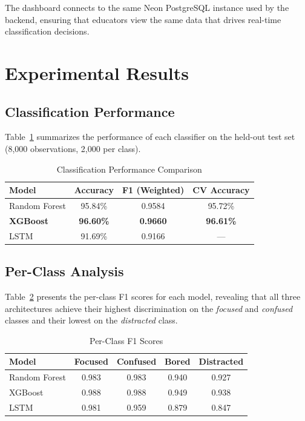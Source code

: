 \documentclass[conference]{IEEEtran}
\begin{document}
The dashboard connects to the same Neon PostgreSQL instance used by the backend, ensuring that educators view the same data that drives real-time classification decisions.

\section{Experimental Results}

\subsection{Classification Performance}

Table~\ref{tab:results} summarizes the performance of each classifier on the held-out test set (8,000 observations, 2,000 per class).

\begin{table}[h]
\caption{Classification Performance Comparison}
\label{tab:results}
\centering
\begin{tabular}{@{}lccc@{}}
\toprule
\textbf{Model} & \textbf{Accuracy} & \textbf{F1 (Weighted)} & \textbf{CV Accuracy} \\
\midrule
Random Forest & 95.84\% & 0.9584 & 95.72\% \\
\textbf{XGBoost} & \textbf{96.60\%} & \textbf{0.9660} & \textbf{96.61\%} \\
LSTM & 91.69\% & 0.9166 & --- \\
\bottomrule
\end{tabular}
\end{table}

\subsection{Per-Class Analysis}

Table~\ref{tab:perclass} presents the per-class F1 scores for each model, revealing that all three architectures achieve their highest discrimination on the \textit{focused} and \textit{confused} classes and their lowest on the \textit{distracted} class.

\begin{table}[h]
\caption{Per-Class F1 Scores}
\label{tab:perclass}
\centering
\begin{tabular}{@{}lcccc@{}}
\toprule
\textbf{Model} & \textbf{Focused} & \textbf{Confused} & \textbf{Bored} & \textbf{Distracted} \\
\midrule
Random Forest & 0.983 & 0.983 & 0.940 & 0.927 \\
XGBoost & 0.988 & 0.988 & 0.949 & 0.938 \\
LSTM & 0.981 & 0.959 & 0.879 & 0.847 \\
\bottomrule
\end{tabular}
\end{table}
\end{document}
